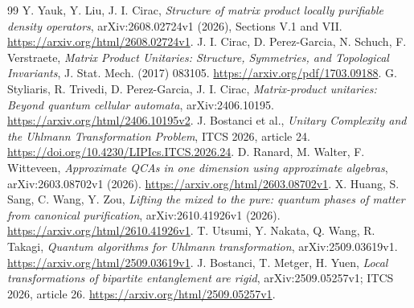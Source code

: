 \documentclass[11pt]{article}
\begin{document}
\begin{thebibliography}{99}
 Y. Yauk, Y. Liu, J. I. Cirac, \emph{Structure of matrix product locally purifiable density operators}, arXiv:2608.02724v1 (2026), Sections V.1 and VII. \url{https://arxiv.org/html/2608.02724v1}.
 J. I. Cirac, D. Perez-Garcia, N. Schuch, F. Verstraete, \emph{Matrix Product Unitaries: Structure, Symmetries, and Topological Invariants}, J. Stat. Mech. (2017) 083105. \url{https://arxiv.org/pdf/1703.09188}.
 G. Styliaris, R. Trivedi, D. Perez-Garcia, J. I. Cirac, \emph{Matrix-product unitaries: Beyond quantum cellular automata}, arXiv:2406.10195. \url{https://arxiv.org/html/2406.10195v2}.
 J. Bostanci et al., \emph{Unitary Complexity and the Uhlmann Transformation Problem}, ITCS 2026, article 24. \url{https://doi.org/10.4230/LIPIcs.ITCS.2026.24}.
 D. Ranard, M. Walter, F. Witteveen, \emph{Approximate QCAs in one dimension using approximate algebras}, arXiv:2603.08702v1 (2026). \url{https://arxiv.org/html/2603.08702v1}.
 X. Huang, S. Sang, C. Wang, Y. Zou, \emph{Lifting the mixed to the pure: quantum phases of matter from canonical purification}, arXiv:2610.41926v1 (2026). \url{https://arxiv.org/html/2610.41926v1}.
 T. Utsumi, Y. Nakata, Q. Wang, R. Takagi, \emph{Quantum algorithms for Uhlmann transformation}, arXiv:2509.03619v1. \url{https://arxiv.org/html/2509.03619v1}.
 J. Bostanci, T. Metger, H. Yuen, \emph{Local transformations of bipartite entanglement are rigid}, arXiv:2509.05257v1; ITCS 2026, article 26. \url{https://arxiv.org/html/2509.05257v1}.
\end{thebibliography}
\end{document}
